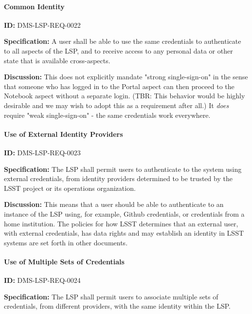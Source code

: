 \documentclass[SE,toc,lsstdraft]{lsstdoc}
\begin{document}
\paragraph{Common Identity}\hfill  %

\label{DMS-LSP-REQ-0022}
\textbf{ID:} DMS-LSP-REQ-0022

\textbf{Specification:}
A user shall be able to use the same credentials to authenticate to all aspects of the LSP, and to receive access to any personal data or other state that is available cross-aspects.

\textbf{Discussion:}
This does not explicitly mandate "strong single-sign-on" in the sense that someone who has logged in to the Portal aspect can then proceed to the Notebook aspect without a separate login. (TBR: This behavior would be highly desirable and we may wish to adopt this as a requirement after all.) It \textit{does} require "weak single-sign-on" - the same credentials work everywhere.

\paragraph{Use of External Identity Providers}\hfill  %

\label{DMS-LSP-REQ-0023}
\textbf{ID:} DMS-LSP-REQ-0023

\textbf{Specification:}
The LSP shall permit users to authenticate to the system using external credentials, from identity providers determined to be trusted by the LSST project or its operations organization.

\textbf{Discussion:}
This means that a user should be able to authenticate to an instance of the LSP using, for example, Github credentials, or credentials from a home institution.
The policies for how LSST determines that an external user, with external credentials, has data rights and may establish an identity in LSST systems are set forth in other documents.

\paragraph{Use of Multiple Sets of Credentials}\hfill  %

\label{DMS-LSP-REQ-0024}
\textbf{ID:} DMS-LSP-REQ-0024

\textbf{Specification:}
The LSP shall permit users to associate multiple sets of credentials, from different providers, with the same identity within the LSP.
\end{document}

